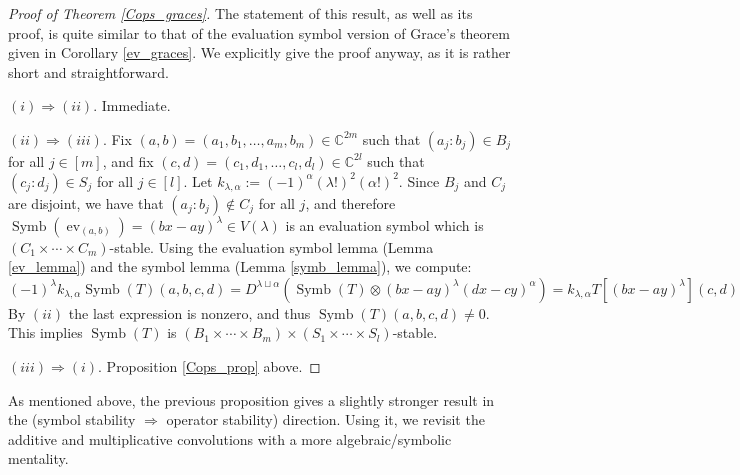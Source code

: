 \documentclass{article}
\theoremstyle{definition}
\theoremstyle{plain}
\newcommand{\C}{\mathbb{C}}
\DeclareMathOperator{\Symb}{Symb}
\DeclareMathOperator{\ev}{ev}
\begin{document}
\begin{proof}[Proof of Theorem \ref{Cops_graces}]
    The statement of this result, as well as its proof, is quite similar to that of the evaluation symbol version of Grace's theorem given in Corollary \ref{ev_graces}. We explicitly give the proof anyway, as it is rather short and straightforward.
    
    $(i) \Rightarrow (ii)$. Immediate.
    
    $(ii) \Rightarrow (iii)$. Fix $(a,b) = (a_1,b_1,\ldots,a_m,b_m) \in \C^{2m}$ such that $(a_j:b_j) \in B_j$ for all $j \in [m]$, and fix $(c,d) = (c_1,d_1,\ldots,c_l,d_l) \in \C^{2l}$ such that $(c_j:d_j) \in S_j$ for all $j \in [l]$. Let $k_{\lambda,\alpha} := (-1)^\alpha(\lambda!)^2(\alpha!)^2$. Since $B_j$ and $C_j$ are disjoint, we have that $(a_j:b_j) \not\in C_j$ for all $j$, and therefore $\Symb(\ev_{(a,b)}) = (bx-ay)^\lambda \in V(\lambda)$ is an evaluation symbol which is $(C_1 \times \cdots \times C_m)$-stable. Using the evaluation symbol lemma (Lemma \ref{ev_lemma}) and the symbol lemma (Lemma \ref{symb_lemma}), we compute:
    \[
        (-1)^\lambda k_{\lambda,\alpha} \Symb(T)(a,b,c,d) = D^{\lambda \sqcup \alpha}(\Symb(T) \otimes (bx-ay)^\lambda (dx-cy)^\alpha) = k_{\lambda,\alpha} T[(bx-ay)^\lambda](c,d)
    \]
    By $(ii)$ the last expression is nonzero, and thus $\Symb(T)(a,b,c,d) \neq 0$. This implies $\Symb(T)$ is $(B_1 \times \cdots \times B_m) \times (S_1 \times \cdots \times S_l)$-stable.
    
    $(iii) \Rightarrow (i)$. Proposition \ref{Cops_prop} above.
\end{proof}

As mentioned above, the previous proposition gives a slightly stronger result in the (symbol stability $\Rightarrow$ operator stability) direction. Using it, we revisit the additive and multiplicative convolutions with a more algebraic/symbolic mentality.
\end{document}
